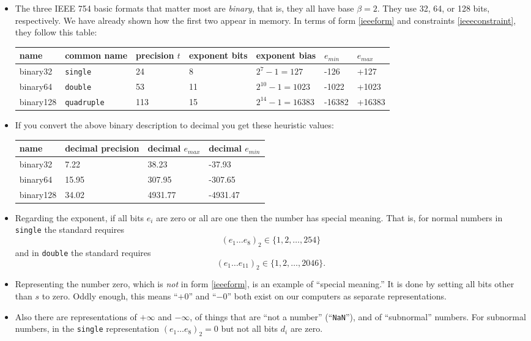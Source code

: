 \documentclass[11pt]{amsart}
\begin{document}
\begin{itemize}
\item The three IEEE 754 basic formats that matter most are \emph{binary}, that is, they all have base $\beta=2$.  They use 32, 64, or 128 bits, respectively.  We have already shown how the first two appear in memory.  In terms of form \eqref{ieeeform} and constraints \eqref{ieeeconstraint}, they follow this table:

\medskip
\small
\begin{tabular}{lllllll}
name     & common name & precision $t$ & exponent bits & exponent bias & $e_{min}$ & $e_{max}$ \\ \hline
binary32 &    \texttt{single} & 24 &  8 &     $2^7-1=127$ &  -126 &  +127 \\
binary64 &    \texttt{double} & 53 & 11 & $2^{10}-1=1023$ & -1022 & +1023 \\
binary128 &\texttt{quadruple} &113 & 15 &$2^{14}-1=16383$ &-16382 &+16383
\end{tabular}
\normalsize
\medskip

\item If you convert the above binary description to decimal you get these heuristic values:

\medskip
\small
\begin{tabular}{llll}
name & decimal precision & decimal $e_{max}$ & decimal $e_{min}$ \\ \hline
binary32 & 7.22 & 38.23 & -37.93 \\
binary64 & 15.95 & 307.95 & -307.65 \\
binary128 & 34.02 & 4931.77 & -4931.47
\end{tabular}
\normalsize
\medskip

\item Regarding the exponent, if all bits $e_i$ are zero or all are one then the number has special meaning.  That is, for normal numbers in \texttt{single} the standard requires
   $$\left(e_1\dots e_8\right)_2 \in \{1,2,\dots,254\}$$
and in \texttt{double} the standard requires
   $$\left(e_1\dots e_{11}\right)_2 \in \{1,2,\dots,2046\}.$$

\item Representing the number zero, which  is \emph{not} in form \eqref{ieeeform}, is an example of ``special meaning.''  It is done by setting all bits other than $s$ to zero.  Oddly enough, this means ``$+0$'' and ``$-0$'' both exist on our computers as separate representations.

\item Also there are representations of $+\infty$ and $-\infty$, of things that are ``not a number'' (``\texttt{NaN}''), and of ``subnormal'' numbers.  For subnormal numbers, in the \texttt{single} representation $\left(e_1\dots e_8\right)_2 = 0$ but not all bits $d_i$ are zero.


\end{itemize}
\end{document}
